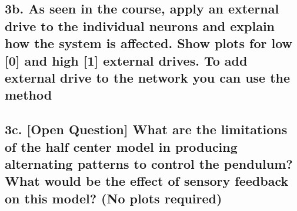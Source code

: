 \documentclass{cmc}
\begin{document}
\subsection*{3b. As seen in the course, apply an external drive to the
  individual neurons and explain how the system is affected. Show
  plots for low [0] and high [1] external drives. To add external
  drive to the network you can use the method \\
}
\label{sec:4c}


\subsection*{3c. [Open Question] What are the limitations of the half
  center model in producing alternating patterns to control the
  pendulum? What would be the effect of sensory feedback on this
  model? (No plots required)}
\label{sec:4d}


\newpage
\end{document}
